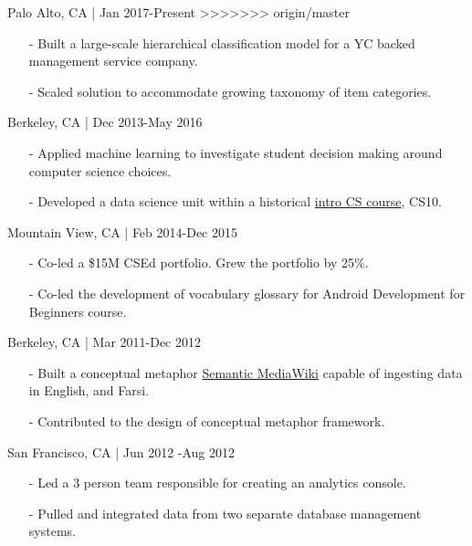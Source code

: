 \documentclass[11pt,article,oneside]{memoir}
\begin{document}
\begin{itemize}
\begin{itemize}
 \hfill Palo Alto, CA | Jan 2017-Present
>>>>>>> origin/master
\begin{itemize}[nolistsep]
\item[-]Built a large-scale hierarchical classification model for a YC backed management service company.
\item[-]Scaled solution to accommodate growing taxonomy of item categories.
\end{itemize} 

 \hfill Berkeley, CA | Dec 2013-May 2016
\begin{itemize}[nolistsep]
\item[-] Applied machine learning to investigate student decision making around computer science choices.
\item[-] Developed a data science unit within a historical \href{http://www.whitehouse.gov/the-press-office/2014/12/08/fact-sheet-new-commitments-support-computer-science-education}{intro CS course}, CS10.
\end{itemize}  

 \hfill Mountain View, CA | Feb 2014-Dec 2015
\begin{itemize}[nolistsep]
\item[-]Co-led a \$15M CSEd portfolio. Grew the portfolio by 25\%.
\item[-]Co-led the development of vocabulary glossary for Android Development for Beginners course.
\end{itemize} 

 \hfill Berkeley, CA | Mar 2011-Dec 2012
\begin{itemize}[nolistsep]
\item[-] Built a conceptual metaphor \href{http://metaphor.icsi.berkeley.edu}{Semantic MediaWiki} capable of ingesting data in English, and Farsi.
\item[-] Contributed to the design of conceptual metaphor framework.
\end{itemize} 

 \hfill San Francisco, CA | Jun 2012 -Aug 2012
\begin{itemize}[nolistsep]
\item[-]Led a 3 person team responsible for creating an analytics console.
\item[-]Pulled and integrated data from two separate database management systems.
\end{itemize} 


\end{itemize}
\end{itemize}
\end{document}
